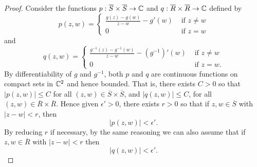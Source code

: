 \documentclass{amsart}
\begin{document}
\begin{proof}
Consider the functions $p:\overline{S} \times \overline{S} \to \mathbb{C}$ and $q:\overline{R} \times \overline{R} \to \mathbb{C}$ defined by
\begin{equation}\label{eq:path1} 
p(z,w) = 
\begin{cases}
\frac{g(z) - g(w)}{z-w} - g'(w) &\text{ if $z\neq w$}\\
0 &\text{ if $z= w$}
\end{cases}
\end{equation}
and
\begin{equation}\label{eq:path1a} 
q(z,w) = 
\begin{cases}
\frac{g^{-1}(z) - g^{-1}(w)}{z-w} - (g^{-1})'(w) &\text{ if $z\neq w$}\\
0 &\text{ if $z= w$.}
\end{cases}
\end{equation}
By differentiability of $g$ and $g^{-1}$, both $p$ and $q$ are continuous functions on compact sets in $\mathbb{C}^2$ and hence bounded. That is, there exists $C>0$ so that $|p(z,w)|\leq C$ for all $(z,w) \in \overline{S} \times \overline{S}$, and $|q(z,w)| \leq C$, for all $(z,w) \in \overline{R} \times \overline{R}$.
Hence given $\epsilon '>0$, there exists $r>0$ so that if $z,w\in \overline{S}$ with $|z-w|<r$, then 
\begin{equation}
\label{eq:path10}
|p(z,w)| < \epsilon '. 
\end{equation}
By reducing $r$ if necessary, by the same reasoning we can also assume that if $z,w\in \overline{R}$ with $|z-w| <r$ then 
\begin{equation}
\label{eq:path11}
|q(z,w)| < \epsilon '.
\end{equation}


\end{proof}
\end{document}
